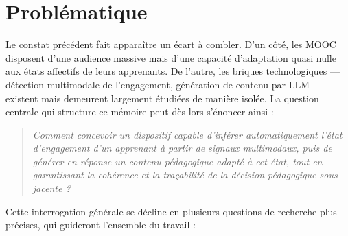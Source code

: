 \section{Problématique}
\label{sec:problematique}

Le constat précédent fait apparaître un écart à combler. D'un côté, les MOOC
disposent d'une audience massive mais d'une capacité d'adaptation quasi nulle aux
états affectifs de leurs apprenants. De l'autre, les briques technologiques —
détection multimodale de l'engagement, génération de contenu par LLM — existent
mais demeurent largement étudiées de manière isolée. La question centrale qui
structure ce mémoire peut dès lors s'énoncer ainsi :

\begin{quote}
\itshape
Comment concevoir un dispositif capable d'inférer automatiquement l'état
d'engagement d'un apprenant à partir de signaux multimodaux, puis de générer en
réponse un contenu pédagogique adapté à cet état, tout en garantissant la
cohérence et la traçabilité de la décision pédagogique sous-jacente ?
\end{quote}

Cette interrogation générale se décline en plusieurs questions de recherche plus
précises, qui guideront l'ensemble du travail :


